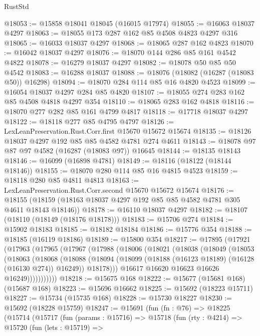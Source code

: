 \begin{lexlean}{RustStd}
\begin{coremodule}
@18053 := @15858 @18041 @18045 (@16015 @17974)
@18055 := @16063 @18037 @4297
@18063 := @18055 @173 @287 @162 @85 @4508 @4823 @4297 @316
@18065 := @16033 @18037 @4297
@18068 := @18065 @287 @162 @4823
@18070 := @16042 @18037 @4297
@18076 := @18070 @144 @286 @85 @161 @4542 @4822
@18078 := @16279 @18037 @4297
@18082 := @18078 @50 @85 @50 @4542
@18083 := @16288 @18037
@18088 := @18076 (@18082 (@16287 (@18083 @50)) @16298)
@18094 := @18070 @284 @114 @85 @16 @4820 @4523
@18099 := @16054 @18037 @4297 @284 @85 @4820
@18107 := @18055 @274 @283 @162 @85 @4508 @4818 @4297 @354
@18110 := @18065 @283 @162 @4818
@18116 := @18070 @277 @282 @85 @161 @4799 @4817
@18118 := @17718 @18037 @4297
@18122 := @18118 @277 @85 @4795 @4797
@18126 := LexLeanPreservation.Rust.Corr.first @15670 @15672 @15674
@18135 := @18126 @18037 @4297 @192 @85 @85 @4582 @4781 @274 @4611
@18143 := @18078 @97 @87 @97 @4582 (@16287 (@18083 @97)) @16645
@18144 := @18135 @18143
@18146 := @16099 (@16898 @4781)
@18149 := @18116 (@18122 (@18144 @18146))
@18155 := @18070 @280 @114 @85 @16 @4815 @4523
@18159 := @18118 @280 @85 @4811 @4813
@18163 := LexLeanPreservation.Rust.Corr.second @15670 @15672 @15674
@18176 := @18155 (@18159 (@18163 @18037 @4297 @192 @85 @85 @4582 @4781 @305 @4611 @18143 @18146))
@18178 := @16110 @18037 @4297
@18182 := @18107 (@18110 (@18149 (@18176 @18178)))
@18183 := @15706 @274
@18184 := @15902 @18183
@18185 := @18182 @18184
@18186 := @15776 @354
@18188 := @18185 (@16119 @18186)
@18189 := @15800 @354
@18217 := @17895
    (@17921
      (@17963
        (@17965
          (@17967
            (@17988
              (@18006
                (@18021
                  (@18038
                    (@18049
                      (@18053
                        (@18063
                          (@18068
                            (@18088
                              (@18094
                                (@18099 (@18188 (@16123 @18189) (@16128 (@16130 @274)) @16249))
                                @18178)))
                          @16617
                          @16620
                          @16623
                          @16626
                          @16249)))))))))))
@18218 := @15675 @168
@18222 := @15677 (@15681 @168) (@15687 @168)
@18223 := @15696 @16662
@18225 := @15692 (@18223 @15711)
@18227 := @15734 (@15735 @168)
@18228 := @15730 @18227
@18230 := @15692 (@18228 @15759)
@18247 := @15691
    (fun (fn : @76) =>
    @18225
      (@15714
        (@15717
          (fun (params : @15716) =>
          @15718
            (fun (rty : @4214) =>
            @15720
              (fun (lets : @15719) =>

\end{coremodule}
\end{lexlean}
